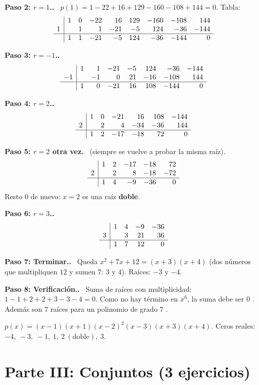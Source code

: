 \documentclass[11pt,a4paper]{article}
\newcommand{\paso}[1]{\par\medskip\noindent\textbf{\textcolor{blue!50!black}{Paso #1.}}\ }
\begin{document}
\paso{2: $r=1$.} $p(1)=1-22+16+129-160-108+144=0$. Tabla:
\[
\begin{array}{r|rrrrrrrr}
 & 1 & 0 & -22 & 16 & 129 & -160 & -108 & 144\\
1 & & 1 & 1 & -21 & -5 & 124 & -36 & -144\\ \hline
 & 1 & 1 & -21 & -5 & 124 & -36 & -144 & 0
\end{array}
\]
\paso{3: $r=-1$.}
\[
\begin{array}{r|rrrrrrr}
 & 1 & 1 & -21 & -5 & 124 & -36 & -144\\
-1 & & -1 & 0 & 21 & -16 & -108 & 144\\ \hline
 & 1 & 0 & -21 & 16 & 108 & -144 & 0
\end{array}
\]
\paso{4: $r=2$.}
\[
\begin{array}{r|rrrrrr}
 & 1 & 0 & -21 & 16 & 108 & -144\\
2 & & 2 & 4 & -34 & -36 & 144\\ \hline
 & 1 & 2 & -17 & -18 & 72 & 0
\end{array}
\]
\paso{5: $r=2$ otra vez} (siempre se vuelve a probar la misma raíz).
\[
\begin{array}{r|rrrrr}
 & 1 & 2 & -17 & -18 & 72\\
2 & & 2 & 8 & -18 & -72\\ \hline
 & 1 & 4 & -9 & -36 & 0
\end{array}
\]
Resto $0$ de nuevo: $x=2$ es una raíz \textbf{doble}.

\paso{6: $r=3$.}
\[
\begin{array}{r|rrrr}
 & 1 & 4 & -9 & -36\\
3 & & 3 & 21 & 36\\ \hline
 & 1 & 7 & 12 & 0
\end{array}
\]
\paso{7: Terminar.} Queda $x^2+7x+12=(x+3)(x+4)$ (dos números que multipliquen $12$ y sumen $7$: $3$ y $4$). Raíces: $-3$ y $-4$.

\paso{8: Verificación.} Suma de raíces con multiplicidad: $1-1+2+2+3-3-4=0$. Como no hay término en $x^6$, la suma debe ser $0$ \checkmark. Además son $7$ raíces para un polinomio de grado $7$ \checkmark.
\begin{respuesta}
$p(x)=(x-1)(x+1)(x-2)^2(x-3)(x+3)(x+4)$. \quad Ceros reales: $-4,\ -3,\ -1,\ 1,\ 2\ (\text{doble}),\ 3$.
\end{respuesta}

\newpage
\section{Parte III: Conjuntos (3 ejercicios)}
\end{document}
